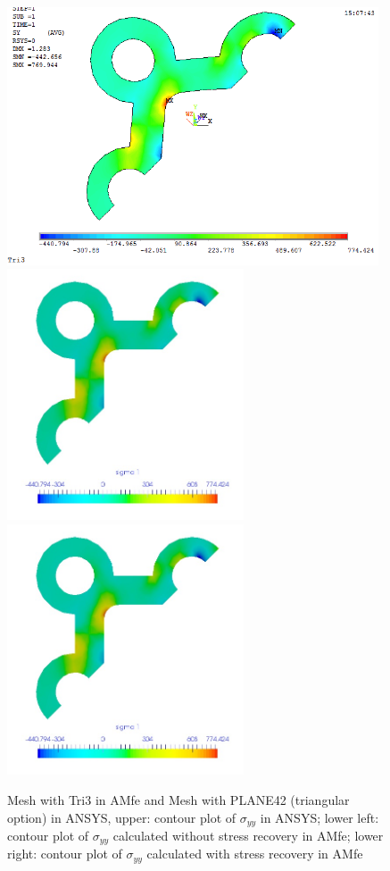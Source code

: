 \begin{figure}[htbp]
	\begin{center}
		\includegraphics[width=11cm,clip]{TTri3_Syy.png} 	
		\includegraphics[width=7cm,clip]{TTri3_Syy_PD.png} 	
		\includegraphics[width=7cm,clip]{TTri3_Syy_P.png} 		
		\caption{Mesh with Tri3 in AMfe and Mesh with PLANE42 (triangular option) in ANSYS, upper: contour plot of $\sigma_{yy}$ in ANSYS; lower left: contour plot of $\sigma_{yy}$ calculated without stress recovery in AMfe; lower right: contour plot of $\sigma_{yy}$ calculated with stress recovery in AMfe} \label{fig: Tri3_Syy}
	\end{center}
\end{figure}
\clearpage 

